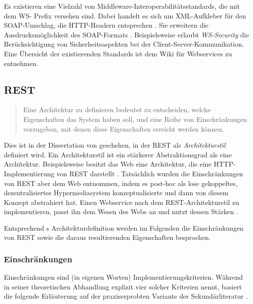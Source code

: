 \documentclass[11pt, a4paper, titlepage, listof=totoc, bibliography=totoc, index=totoc, twoside, openright, headings=normal, draft]{scrreprt}
\begin{document}
Es existieren eine Vielzahl von Middleware-Interoperabilitätsstandards, die mit dem \glqq WS-\grqq{} Prefix versehen sind. Dabei handelt es sich um \glqq XML-Aufkleber\grqq{} für den SOAP-Umschlag, die HTTP-Headern entsprechen \citep{richardson07}. Sie erweitern die Ausdrucksmöglichkeit des SOAP-Formats \citep{wilde11}. Beispielsweise erlaubt \emph{WS-Security} die Berücksichtigung von Sicherheitsaspekten bei der Client-Server-Kommunikation. Eine Übersicht der existierenden Standards ist dem Wiki für Webservices \citep{webServiceWiki09} zu entnehmen.

\subsection{REST}
\label{REST}
\begin{quote}
\glqq Eine Architektur zu definieren bedeutet zu entscheiden, welche Eigenschaften das System haben soll, und eine Reihe von Einschränkungen vorzugeben, mit denen diese Eigenschaften erreicht werden können.\grqq{} \citep{tilkov11}
\end{quote}

Dies ist in der Dissertation von \citeauthor{fielding00} geschehen, in der REST als \emph{Architekturstil} definiert wird. Ein Architekturstil ist ein stärkerer Abstraktionsgrad als eine Architektur. Beispielsweise besitzt das Web eine Architektur, die eine HTTP-Implementierung von REST darstellt \citep{tilkov11}. Tatsächlich wurden die Einschränkungen von REST aber dem Web entnommen, indem \citeauthor{fielding00} es post-hoc als lose gekoppeltes, dezentralisiertes Hypermediasystem konzeptualisierte \citep{wilde11} und dann von diesem Konzept abstrahiert hat. Einen Webservice nach dem REST-Architekturstil zu implementieren, passt ihn dem Wesen des Webs an und nutzt dessen Stärken \citep{tilkov11}.

Entsprechend \citeauthor{tilkov11}s Architekturdefinition werden im Folgenden die Einschränkungen von REST sowie die daraus resultierenden Eigenschaften besprochen.

\subsubsection{Einschränkungen}
\label{Einschränkungen}
Einschränkungen sind (in eigenen Worten) Implementierungskriterien. Während \citeauthor{fielding00} in seiner theoretischen Abhandlung explizit vier solcher Kriterien nennt, basiert die folgende Erläuterung auf der praxiserprobten Variante der Sekundärliteratur \citep{wilde11, tilkov11}.
\end{document}

